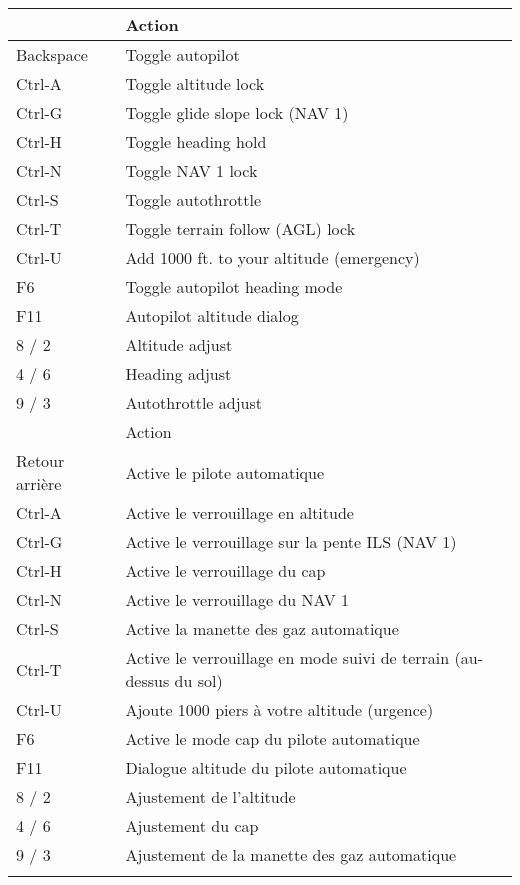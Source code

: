 \begin{tabular}{|l|l|}\hline
\iflanguage{english}{
 Key              &         Action\\\hline
    Backspace     &         Toggle autopilot\\
    Ctrl-A        &         Toggle altitude lock \index{altitude hold}\\
    Ctrl-G        &         Toggle glide slope lock (NAV 1)\\
    Ctrl-H        &         Toggle heading hold\index{heading hold}\\
    Ctrl-N        &         Toggle NAV 1 lock\\
    Ctrl-S        &         Toggle autothrottle\index{autothrottle}\\
    Ctrl-T        &         Toggle terrain follow (AGL) lock\\
    Ctrl-U        &         Add 1000 ft. to your altitude (emergency)\\
    F6            &         Toggle autopilot heading mode\\
    F11           &         Autopilot altitude dialog\\\hline
    8 / 2         &         Altitude adjust\\
    4 / 6         &         Heading adjust\\
    9 / 3         &         Autothrottle adjust \\\hline
}{}
\iflanguage{french}{
 Touche           &         Action\\\hline
    Retour arri\`{e}re     &         Active le pilote automatique\\
    Ctrl-A        &         Active le verrouillage en altitude \index{maintien d'altitude}\\
    Ctrl-G        &         Active le verrouillage sur la pente ILS (NAV 1)\\
    Ctrl-H        &         Active le verrouillage du cap \index{maintient de cap}\\
    Ctrl-N        &         Active le verrouillage du NAV 1\\
    Ctrl-S        &         Active la manette des gaz automatique\index{manette des gaz automatique}\\
    Ctrl-T        &         Active le verrouillage en mode suivi de terrain (au-dessus du sol)\\
    Ctrl-U        &         Ajoute 1000 piers \`{a} votre altitude (urgence)\\
    F6            &         Active le mode cap du pilote automatique\\
    F11           &         Dialogue altitude du pilote automatique\\\hline
    8 / 2         &         Ajustement de l'altitude\\
    4 / 6         &         Ajustement du cap\\
    9 / 3         &         Ajustement de la manette des gaz automatique \\\hline
}{}
\end{tabular}

